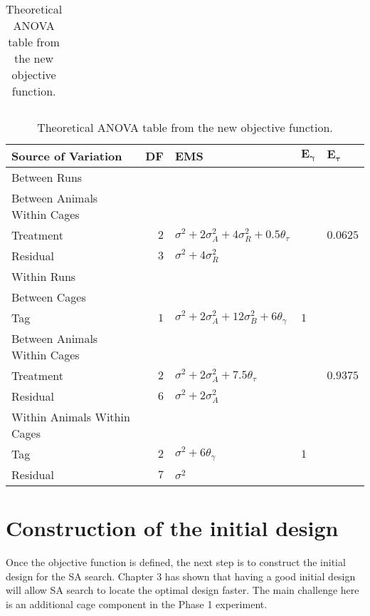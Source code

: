 \begin{table}[ht]
 \begin{tabular} {l}
 	\\
 \end{tabular} 
\caption{Theoretical ANOVA table from the new objective function.}
 \begin{tabular}[t]{lrlll} 
 \toprule 
 \multicolumn{1}{l}{\textbf{Source of Variation}} & \multicolumn{1}{l}{\textbf{DF}} & \multicolumn{1}{l}{\textbf{EMS}}& \multicolumn{1}{l}{$\bm{E_{\gamma}}$}&\multicolumn{1}{l}{$\bm{E_{\tau}}$}\\ 
 \midrule 
 Between Runs &  &  & & \\ 
 \quad Between Animals Within Cages &  &  & & \\ 
 \quad \quad Treatment & $2$ & $\sigma^2+2\sigma_{A}^2+4\sigma_{R}^2+ 0.5\theta_{\tau}$ & & $0.0625$\\ 
 \quad Residual & $3$ & $\sigma^2+4\sigma_{R}^2$ & & \\ \hline
 Within Runs&  &  & & \\ 
 \quad Between Cages &  &  & & \\ 
 \quad \quad Tag & $1$ & $\sigma^2+2\sigma_{A}^2+12\sigma_{B}^2+6\theta_{\gamma}$ &$1$ & \\ \hline
 \quad Between Animals Within Cages &  &  & & \\ 
 \quad \quad Treatment & $2$ & $\sigma^2+2\sigma_{A}^2+7.5\theta_{\tau}$ & & $0.9375$\\ 
 \quad \quad Residual & $6$ & $\sigma^2+2\sigma_{A}^2$ & & \\ \hline
 \quad Within Animals Within Cages &  &  & & \\ 
 \quad \quad Tag & $2$ & $\sigma^2+6\theta_{\gamma}$ &$1$ & \\ 
 \quad \quad Residual & $7$ & $\sigma^2$ & & \\ 
 \bottomrule 
 \end{tabular} 
 \label{tab:Phase2ANOVA4Chap4} 
\end{table} 
                                                  

\section{Construction of the initial design}
\label{sec:allocateCage}
Once the objective function is defined, the next step is to construct the initial design for the SA search. Chapter 3 has shown that having a good initial design will allow SA search to locate the optimal design faster. The main challenge here is an additional cage component in the Phase 1 experiment. 

